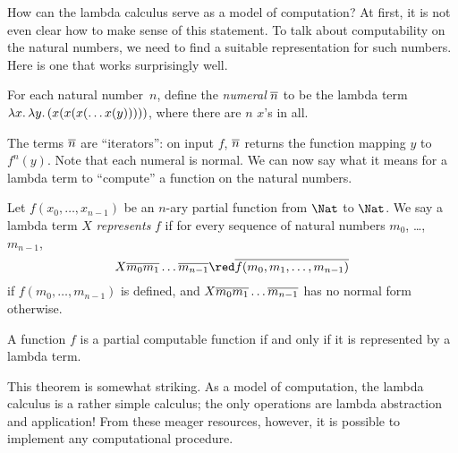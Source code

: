\documentclass[../../include/open-logic-section]{subfiles}
\begin{document}

How can the lambda calculus serve as a model of computation? At first,
it is not even clear how to make sense of this statement. To talk
about computability on the natural numbers, we need to find a suitable
representation for such numbers. Here is one that works surprisingly
well.

\begin{defn}
For each natural number~$n$, define the \emph{numeral} $\overline{n}$ to be
the lambda term $\lambd[x][\lambd[y][(x(x(x(\dots x(y)))))]]$, where
there are $n$ $x$'s in all.
\end{defn}

The terms $\overline{n}$ are ``iterators'': on input $f$, $\overline{n}$ returns
the function mapping $y$ to $f^n(y)$. Note that each numeral is
normal. We can now say what it means for a lambda term to ``compute''
a function on the natural numbers.

\begin{defn}
Let $f(x_0, \dots, x_{n-1})$ be an $n$-ary partial function from $\Nat$
to $\Nat$. We say a lambda term $X$ \emph{represents} $f$ if for every
sequence of natural numbers $m_0$, \dots,~$m_{n-1}$,
\[
X \num{m_0} \num{m_1} \dots \num{m_{n-1}} \red \num{f(m_0, m_1, \dots,
  m_{n-1})}
\]
if $f(m_0, \dots, m_{n-1})$ is defined, and $X \overline{m_0} \overline{m_1}
\dots \overline{m_{n-1}}$ has no normal form otherwise.
\end{defn}

\begin{thm}
A function $f$ is a partial computable function if and only if it is
represented by a lambda term.
\end{thm}

\begin{explain}
This theorem is somewhat striking. As a model of computation, the
lambda calculus is a rather simple calculus; the only operations are
lambda abstraction and application!{} From these meager resources,
however, it is possible to implement any computational procedure.
\end{explain}
\end{document}
